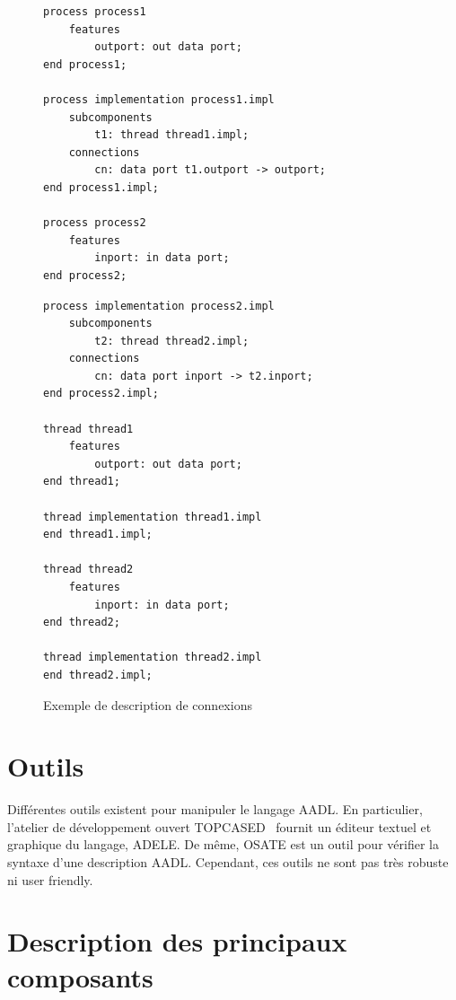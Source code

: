 \documentclass[11pt,a4paper]{paper}
\begin{document}
\begin{appendices}
\begin{figure}[htbp]
\begin{center}
\begin{minipage}[c]{.46\linewidth}
\begin{lstlisting}
process process1
    features
        outport: out data port;
end process1;

process implementation process1.impl
    subcomponents
        t1: thread thread1.impl;
    connections
        cn: data port t1.outport -> outport;
end process1.impl;

process process2
    features
        inport: in data port;
end process2;
\end{lstlisting}
\end{minipage}
\begin{minipage}[c]{.46\linewidth}
\begin{lstlisting}
process implementation process2.impl
    subcomponents
        t2: thread thread2.impl;
    connections
        cn: data port inport -> t2.inport;
end process2.impl;

thread thread1
    features
        outport: out data port;
end thread1;

thread implementation thread1.impl
end thread1.impl;

thread thread2
    features
        inport: in data port;
end thread2;

thread implementation thread2.impl
end thread2.impl;
\end{lstlisting}
\end{minipage}
\caption{Exemple de description de connexions}
\label{fig:connexion}
\end{center}
\end{figure}


\section{Outils}

Différentes outils existent pour manipuler le langage AADL. En particulier, l'atelier de développement ouvert TOPCASED~\cite{topcased} fournit un éditeur textuel et graphique du langage, ADELE. De même, OSATE est un outil pour vérifier la syntaxe d'une description AADL. Cependant, ces outils ne sont pas très robuste ni \og user friendly\fg.
 
\section{Description des principaux composants}

\end{appendices}
\end{document}
